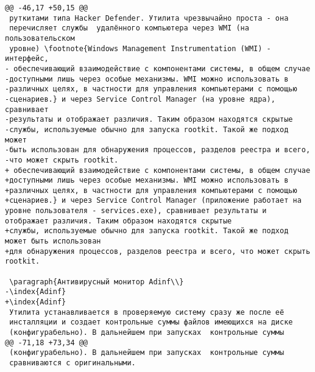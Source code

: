 \begin{verbatim}
@@ -46,17 +50,15 @@
 руткитами типа Hacker Defender. Утилита чрезвычайно проста - она
 перечисляет службы  удалённого компьютера через WMI (на пользовательском
 уровне) \footnote{Windows Management Instrumentation (WMI) - интерфейс,
- обеспечивающий взаимодействие с компонентами системы, в общем случае
-доступными лишь через особые механизмы. WMI можно использовать в
-различных целях, в частности для управления компьютерами с помощью
-сценариев.} и через Service Control Manager (на уровне ядра), сравнивает
-результаты и отображает различия. Таким образом находятся скрытые
-службы, используемые обычно для запуска rootkit. Такой же подход может
-быть использован для обнаружения процессов, разделов реестра и всего,
-что может скрыть rootkit.
+ обеспечивающий взаимодействие с компонентами системы, в общем случае
+доступными лишь через особые механизмы. WMI можно использовать в
+различных целях, в частности для управления компьютерами с помощью
+сценариев.} и через Service Control Manager (приложение работает на уровне пользователя - services.exe), сравнивает результаты и отображает различия. Таким образом находятся скрытые
+службы, используемые обычно для запуска rootkit. Такой же подход может быть использован
+для обнаружения процессов, разделов реестра и всего, что может скрыть rootkit.

 \paragraph{Антивирусный монитор Adinf\\}
-\index{Adinf}
+\index{Adinf}
 Утилита устанавливается в проверяемую систему сразу же после её
 инсталляции и создает контрольные суммы файлов имеющихся на диске
 (конфигурабельно). В дальнейшем при запусках  контрольные суммы
@@ -71,18 +73,34 @@
 (конфигурабельно). В дальнейшем при запусках  контрольные суммы
 сравниваются с оригинальными.


\end{verbatim}
